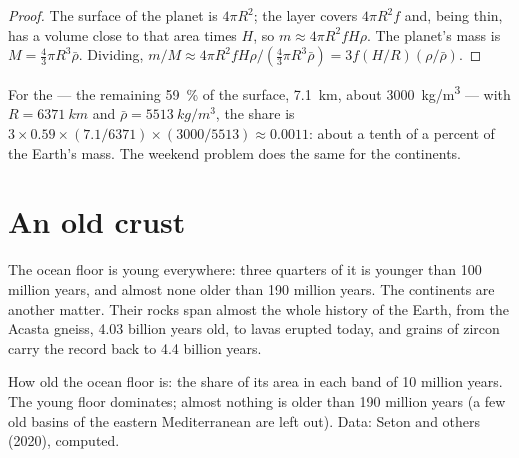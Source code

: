 \begin{proof}
The surface of the planet is $4\pi R^2$; the layer covers $4\pi R^2 f$ and,
being thin, has a volume close to that area times $H$, so $m \approx 4\pi R^2
f H \rho$. The planet's mass is $M = \tfrac{4}{3}\pi R^3 \bar\rho$. Dividing,
$m/M \approx 4\pi R^2 f H \rho / (\tfrac{4}{3}\pi R^3 \bar\rho) = 3 f (H/R)
(\rho/\bar\rho)$.
\end{proof}

For the  --- the remaining \qty{59}{\percent} of the surface,
\qty{7.1}{km}, about \qty{3000}{kg/m^3} --- with $R = \qty{6371}{km}$ and
$\bar\rho = \qty{5513}{kg/m^3}$, the share is $3 \times 0.59 \times
(7.1/6371) \times (3000/5513) \approx 0.0011$: about a tenth of a percent of
the Earth's mass. The weekend problem does the same for the continents.

\section{An old crust}

The ocean floor is young everywhere: three quarters of it is younger than
100 million years, and almost none older than 190 million years. The
continents are another matter. Their rocks span almost the whole history of
the Earth, from the Acasta gneiss, 4.03 billion years old, to lavas erupted
today, and grains of zircon carry the record back to 4.4 billion years.

\begin{omfigure}

{\small How old the ocean floor is: the share of its area in each band of 10
million years. The young floor dominates; almost nothing is older than 190
million years (a few old basins of the eastern Mediterranean are left out).
Data: Seton and others (2020), computed.}
\end{omfigure}

